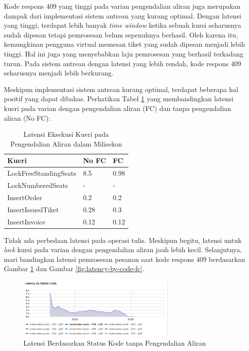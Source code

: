 Kode respons 409 yang tinggi pada varian pengendalian aliran juga merupakan dampak dari implementasi sistem antrean yang kurang optimal. Dengan latensi yang tinggi, terdapat lebih banyak \textit{time window} ketika sebuah kursi seharusnya sudah dipesan tetapi pemrosesan belum sepenuhnya berhasil. Oleh karena itu, kemungkinan pengguna virtual memesan tiket yang sudah dipesan menjadi lebih tinggi. Hal ini juga yang menyebabkan laju pemrosesan yang berhasil terkadang turun. Pada sistem antrean dengan latensi yang lebih rendah, kode respons 409 seharusnya menjadi lebih berkurang.

Meskipun implementasi sistem antrean kurang optimal, terdapat beberapa hal positif yang dapat dibahas. Perhatikan Tabel \ref{table:latensi-kueri-fc-nofc} yang membandingkan latensi kueri pada varian dengan pengendalian aliran (FC) dan tanpa pengendalian aliran (No FC):

\begin{table}[H]
    \centering
    \caption{Latensi Eksekusi Kueri pada Pengendalian Aliran dalam Milisekon}
    \label{table:latensi-kueri-fc-nofc}
    \begin{tabular}{|l|l|l|}
        \hline
        \textbf{Kueri}        & \textbf{No FC} & \textbf{FC} \\
        \hline
        LockFreeStandingSeats & 8.5            & 0.98        \\
        \hline
        LockNumberedSeats     & -              & -           \\
        \hline
        InsertOrder           & 0.2            & 0.2         \\
        \hline
        InsertIssuedTiket     & 0.28           & 0.3         \\
        \hline
        InsertInvoice         & 0.12           & 0.12        \\
        \hline
    \end{tabular}
\end{table}

Tidak ada perbedaan latensi pada operasi tulis. Meskipun begitu, latensi untuk \textit{lock} kursi pada varian dengan pengendalian aliran jauh lebih kecil. Selanjutnya, mari bandingkan latensi pemrosesan pesanan saat kode respons 409 berdasarkan Gambar \ref{fig:latency-by-code-nofc} dan Gambar \ref{fig:latency-by-code-fc}.

\begin{figure}[H]
    \centering
    \includegraphics[width=0.7\textwidth]{resources/chapter-4/latency-by-code-nofc-pg-stress-0.png}
    \caption{Latensi Berdasarkan Status Kode tanpa Pengendalian Aliran}
    \label{fig:latency-by-code-nofc}
\end{figure}

